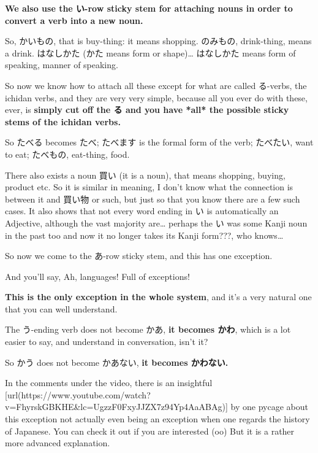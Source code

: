 \stopsectionlevel

\startsectionlevel[title={Converting verbs into nouns},reference={converting-verbs-into-nouns}]

{\bf We also use the い-row sticky stem for attaching nouns in order to convert a verb into a new noun.}

So, かいもの, that is buy-thing: it means shopping. のみもの, drink-thing, means a drink. はなしかた (かた means form or shape)\ldots{} はなしかた means form of speaking, manner of speaking.

So now we know how to attach all these except for what are called る-verbs, the ichidan verbs, and they are very very simple, because all you ever do with these, ever, is {\bf simply cut off the る and you have *all* the possible sticky stems of the ichidan verbs.}

So たべる becomes たべ; たべます is the formal form of the verb;\crlf
たべたい, want to eat; たべもの, eat-thing, food.

There also exists a noun 買い (it is a noun), that means shopping, buying, product etc.\crlf
So it is similar in meaning, I don't know what the connection is between it and 買い物 or such, but just so that you know there are a few such cases. It also shows that not every word ending in い is automatically an Adjective, although the vast majority are\ldots{} perhaps the い was some Kanji noun in the past too and now it no longer takes its Kanji form???, who knows\ldots{}

{}

\stopsectionlevel

\stopsectionlevel

\startsectionlevel[title={The あ-stem},reference={the-あ-stem}]

So now we come to the あ-row sticky stem, and this has one exception.

{}

And you'll say, Ah, languages! Full of exceptions!

{\bf This is the only exception in the whole system}, and it's a very natural one that you can well understand.

The う-ending verb does not become かあ, {\bf it becomes かわ}, which is a lot easier to say, and understand in conversation, isn't it?

So かう does not become かあない, {\bf it becomes かわない.}

In the comments under the video, there is an insightful [url(https://www.youtube.com/watch?v=FhyrskGBKHE&lc=UgzzF0FxyJJZX7z94Yp4AaABAg)] by one pycage about this exception not actually even being an exception when one regards the history of Japanese. You can check it out if you are interested (oo) But it is a rather more advanced explanation.

